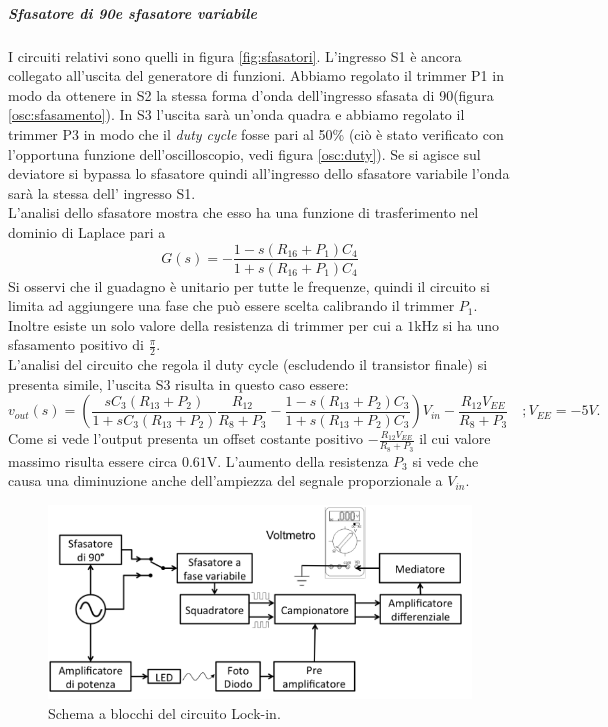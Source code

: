 \documentclass[10pt,a4paper]{article}
\begin{document}
\subparagraph{Sfasatore di 90\degree e sfasatore variabile}
I circuiti relativi sono quelli in figura \ref{fig:sfasatori}. L'ingresso S1 è ancora collegato all'uscita del generatore di funzioni. Abbiamo regolato il trimmer P1 in modo da ottenere in S2 la stessa forma d'onda dell'ingresso sfasata di 90\degree (figura \ref{osc:sfasamento}). In S3 l'uscita sarà un'onda quadra e abbiamo regolato il trimmer P3 in modo che il \emph{duty cycle} fosse pari al 50\% (ciò è stato verificato con l'opportuna funzione dell'oscilloscopio, vedi figura \ref{osc:duty}). Se si agisce sul deviatore si bypassa lo sfasatore quindi all'ingresso dello sfasatore variabile l'onda sarà la stessa dell' ingresso S1.\\
L'analisi dello sfasatore mostra che esso ha una funzione di trasferimento nel dominio di Laplace pari a
\begin{equation}
 G(s) = -\frac{1-s(R_{16} +P_1) C_{4}}{1+s(R_{16} + P_1)C_{4}}
\end{equation}
Si osservi che il guadagno è unitario per tutte le frequenze, quindi il circuito si limita ad aggiungere una fase che può essere scelta calibrando il trimmer $P_1$. Inoltre esiste un solo valore della resistenza di trimmer per cui a $1$kHz si ha uno sfasamento positivo di $\frac{\pi}{2}$.\\
L'analisi del circuito che regola il duty cycle (escludendo il transistor finale) si presenta simile, l'uscita S3 risulta in questo caso essere:
\begin{equation}
v_{out}(s) = \left( \frac{s C_3 (R_{13} + P_2)}{1 + s C_3 (R_{13} + P_2)} \frac{R_{12}}{R_8+P_3} -\frac{1-s(R_{13} +P_2) C_{3}}{1+s(R_{13} + P_2)C_{3}} \right) V_{in}-\frac{R_{12} V_{EE}}{R_8+P_3}
\, \, \, \, \, \, ; V_{EE} = -5V.
\end{equation}
Come si vede l'output presenta un offset costante positivo $-\frac{R_{12} V_{EE}}{R_8+P_3}$ il cui valore massimo risulta essere circa $0.61$V. L'aumento della resistenza $P_3$ si vede che causa una diminuzione anche dell'ampiezza del segnale proporzionale a $V_{in}$. 

\begin{figure}[!htb]
  \centering
  \includegraphics[scale=0.75]{schemablocchi.png}
\caption{Schema a blocchi del circuito Lock-in.\label{fig:schemablocchi}}
\end{figure}
\end{document}
